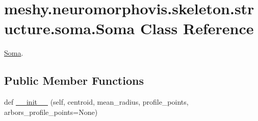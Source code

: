 \hypertarget{classmeshy_1_1neuromorphovis_1_1skeleton_1_1structure_1_1soma_1_1Soma}{}\section{meshy.\+neuromorphovis.\+skeleton.\+structure.\+soma.\+Soma Class Reference}
\label{classmeshy_1_1neuromorphovis_1_1skeleton_1_1structure_1_1soma_1_1Soma}


\hyperlink{classmeshy_1_1neuromorphovis_1_1skeleton_1_1structure_1_1soma_1_1Soma}{Soma}.  


\subsection*{Public Member Functions}
\begin{DoxyCompactItemize}
\item 
def \hyperlink{classmeshy_1_1neuromorphovis_1_1skeleton_1_1structure_1_1soma_1_1Soma_a26e791297debe3487562c6a0f12e0228}{\+\_\+\+\_\+init\+\_\+\+\_\+} (self, centroid, mean\+\_\+radius, profile\+\_\+points, arbors\+\_\+profile\+\_\+points=None)
\end{DoxyCompactItemize}
